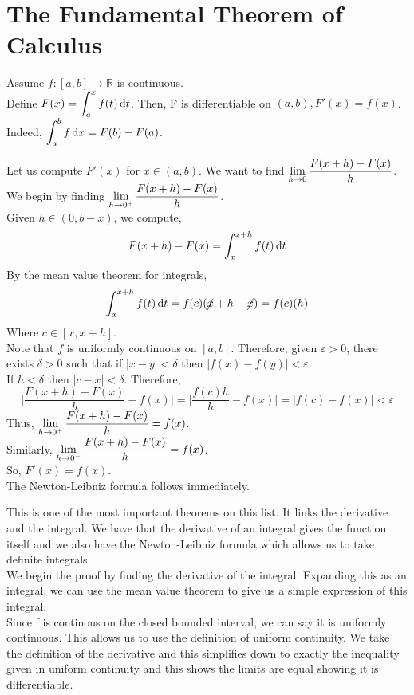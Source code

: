 \documentclass[12pt]{article}
\begin{document}
\section{The Fundamental Theorem of Calculus}
\begin{theo}{}
Assume \(f: [a, b]\to \mathbb R\) is continuous.\\
Define \(F(x) = \displaystyle\int_a^x f(t) \,\mathrm{d} t\). Then, F is differentiable on \((a, b), F'(x) = f(x)\).\\
Indeed, \(\displaystyle\int_a^b f \,\mathrm{d} x = F(b) - F(a)\).    
\end{theo}
\begin{prf}{}
Let us compute \(F'(x)\) for \(x\in(a, b)\). We want to find \(\displaystyle\lim_{h\to 0} \frac{F(x+h) - F(x)}{h}\).\\
We begin by finding \(\displaystyle\lim_{h\to 0^+} \frac{F(x+h) - F(x)}{h}\).\\
Given \(h\in (0, b-x)\), we compute, \[F(x+h) - F(x) = \displaystyle\int_x^{x+h}f(t)\,\mathrm{d} t\]
By the mean value theorem for integrals,
\[\displaystyle\int_x^{x+h} f(t) \,\mathrm{d} t = f(c)(\cancel{x}+ h - \cancel{x}) = f(c)(h)\]
Where \(c\in [x, x+h]\).\\
Note that \(f\) is uniformly continuous on \([a, b]\). Therefore, given \(\varepsilon > 0\), there exists \(\delta > 0\) such that if \(|x-y| < \delta\) then \(|f(x) - f(y)| < \varepsilon\).\\
If \(h < \delta\) then \(|c- x| < \delta\). Therefore, \[\bigg\vert\frac{F(x+h) - F(x)}{h} - f(x)\bigg\vert = \bigg\vert\frac{f(c)h}{h}-f(x)\bigg\vert = |f(c) - f(x)| < \varepsilon\]
Thus, \(\displaystyle\lim_{h\to 0^+} \frac{F(x+h) - F(x)}{h} = f(x)\).\\
Similarly, \(\displaystyle\lim_{h\to 0^-} \frac{F(x+h) - F(x)}{h} = f(x)\).\\
So, \(F'(x) = f(x)\).\\
The Newton-Leibniz formula follows immediately.
\end{prf}
\newpage
\begin{explanation}{}       
    This is one of the most important theorems on this list. It links the derivative and the integral. We have that the derivative of an integral gives the function itself and we also have the Newton-Leibniz formula which allows us to take definite integrals.\\
We begin the proof by finding the derivative of the integral. Expanding this as an integral, we can use the mean value theorem to give us a simple expression of this integral.\\
Since f is continous on the closed bounded interval, we can say it is uniformly continuous. This allows us to use the definition of uniform continuity. We take the definition of the derivative and this simplifies down to exactly the inequality given in uniform continuity and this shows the limits are equal showing it is differentiable.\\
\end{explanation}
\end{document}
